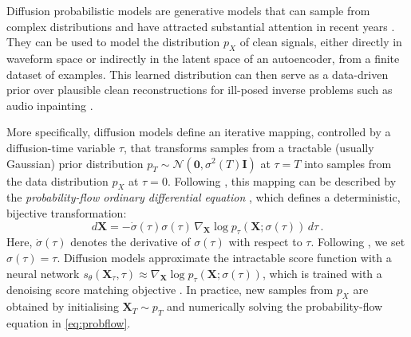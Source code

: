 \documentclass{article}
\begin{document}
Diffusion probabilistic models are generative models that can sample from complex distributions and have attracted substantial attention in recent years \cite{song_score-based_2021, karras2022elucidating}.
They can be used to model the distribution $p_X$ of clean signals, either directly in waveform space or indirectly in the latent space of an autoencoder, from a finite dataset of examples.
This learned distribution can then serve as a data-driven prior over plausible clean reconstructions for ill-posed inverse problems such as audio inpainting \cite{moliner_diffusion-based_2024}.

More specifically, diffusion models define an iterative mapping, controlled by a diffusion-time variable $\tau$, that transforms samples from a tractable (usually Gaussian) prior distribution $p_T \sim \mathcal{N}(\mathbf{0},\sigma^2(T)\mathbf{I})$ at $\tau = T$ into samples from the data distribution $p_X$ at $\tau = 0$.
Following \cite{karras2022elucidating}, this mapping can be described by the \textit{probability-flow ordinary differential equation }, which defines a deterministic, bijective transformation:
\begin{equation}
    d\mathbf{X} = - \dot \sigma(\tau)\sigma(\tau) \, \nabla_{\mathbf{X}} \log p_{\tau}(\mathbf{X}; \sigma(\tau)) \, d\tau \, .
\label{eq:probflow}
\end{equation}
Here, $\dot\sigma(\tau)$ denotes the derivative of $\sigma(\tau)$ with respect to $\tau$.
Following \cite{karras2022elucidating}, we set $\sigma(\tau) = \tau$.
Diffusion models approximate the intractable score function with a neural network
$s_\theta(\mathbf{X}_\tau, \tau) \approx \nabla_{\mathbf{X}} \log p_{\tau}(\mathbf{X}; \sigma(\tau))$, which is trained with a denoising score matching objective \cite{vincent2011connection}.
In practice, new samples from $p_X$ are obtained by initialising $\mathbf{X}_T \sim p_T$ and numerically solving the probability-flow equation in \eqref{eq:probflow}.
\end{document}
